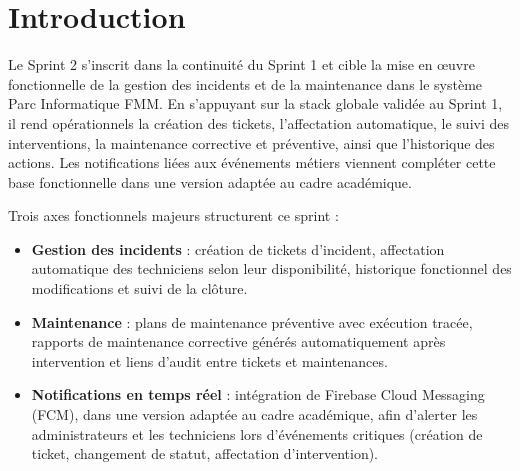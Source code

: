 \vspace{1cm}
\label{chap:sprint2}
\setcounter{chapter}{6}
\setcounter{section}{0}


\localtableofcontents
\newpage
\pagebreak
\section*{Introduction}
\label{sec:intro_sprint2}

Le Sprint 2 s'inscrit dans la continuité du Sprint 1 et cible la mise en œuvre fonctionnelle de la gestion des incidents et de la maintenance dans le système Parc Informatique FMM. En s'appuyant sur la stack globale validée au Sprint 1, il rend opérationnels la création des tickets, l'affectation automatique, le suivi des interventions, la maintenance corrective et préventive, ainsi que l'historique des actions. Les notifications liées aux événements métiers viennent compléter cette base fonctionnelle dans une version adaptée au cadre académique.

Trois axes fonctionnels majeurs structurent ce sprint :
\begin{itemize}
    \item \textbf{Gestion des incidents} : création de tickets d'incident, affectation automatique des techniciens selon leur disponibilité, historique fonctionnel des modifications et suivi de la clôture.
    
    \item \textbf{Maintenance} : plans de maintenance préventive avec exécution tracée, rapports de maintenance corrective générés automatiquement après intervention et liens d'audit entre tickets et maintenances.
    
    \item \textbf{Notifications en temps réel} : intégration de Firebase Cloud Messaging (FCM), dans une version adaptée au cadre académique, afin d'alerter les administrateurs et les techniciens lors d'événements critiques (création de ticket, changement de statut, affectation d'intervention).
\end{itemize}

